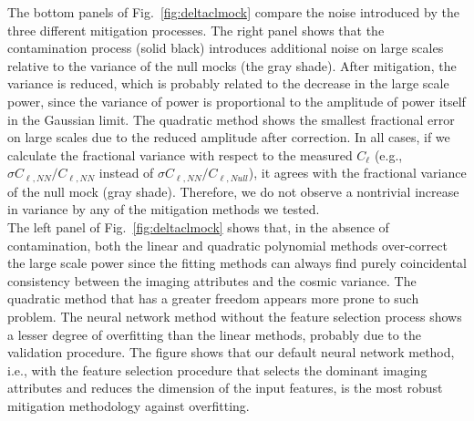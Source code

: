 \documentclass[fleqn, usenatbib]{mnras}
\begin{document}
The bottom panels of Fig.~\ref{fig:deltaclmock} compare the noise introduced by the three different mitigation processes. The right panel shows that the contamination process (solid black) introduces additional noise on large scales relative to the variance of the null mocks (the gray shade). After mitigation, the variance is reduced, which is probably related to the decrease in the large scale power, since the variance of power is proportional to the amplitude of power itself in the Gaussian limit. The quadratic method shows the smallest fractional error on large scales due to the reduced amplitude after correction. In all cases, if we calculate the fractional variance with respect to the measured $C_\ell$ (e.g., $\sigma C_{\ell, NN}/C_{\ell, NN}$ instead of  $\sigma C_{\ell, NN}/C_{\ell, Null}$), it agrees with the fractional variance of the null mock (gray shade). Therefore, we do not observe a nontrivial increase in variance by any of the mitigation methods we tested. \\

The left panel of Fig.~\ref{fig:deltaclmock} shows that, in the absence of contamination, both the linear and quadratic polynomial methods over-correct the large scale power since the fitting methods can always find purely coincidental consistency between the imaging attributes and the cosmic variance. The quadratic method that has a greater freedom appears more prone to such problem. The neural network method without the feature selection process shows a lesser degree of overfitting than the linear methods, probably due to the validation procedure. The figure shows that our default neural network method, i.e., with the feature selection procedure that selects the dominant imaging attributes and reduces the dimension of the input features, is the most robust mitigation methodology against overfitting.
\end{document}
